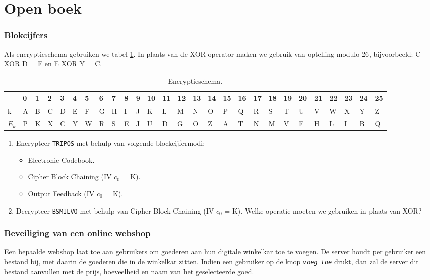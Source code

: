 \documentclass{article}
\begin{document}
\part{Open boek}
\section{Blokcijfers}
Als encryptieschema gebruiken we tabel \ref{table:encryptieschema}. In plaats van de XOR operator maken we gebruik van optelling modulo 26, bijvoorbeeld: C XOR D = F en E XOR Y = C.

\begin{table}[ht]
    \begin{tabular}{l | l l l l l l l l l l l l l l l l l l l l l l l l l l }
        & 0 & 1 & 2 & 3 & 4 & 5 & 6 & 7 & 8 & 9 & 10 & 11 & 12 & 13 & 14 & 15 & 16 & 17 & 18 & 19 & 20 & 21 & 22 & 23 & 24 & 25 \\
        \hline
        k & A & B & C & D & E & F & G & H & I & J & K & L & M & N & O & P & Q & R & S & T & U & V & W & X & Y & Z \\
        $E_k$ & P & K &X& C& Y& W& R& S& E& J& U& D& G& O& Z& A& T& N& M &V &F& H& L& I& B& Q
    \end{tabular}
    \caption{Encryptieschema.}
    \label{table:encryptieschema}
\end{table}
\begin{enumerate}

    \item
Encrypteer \texttt{TRIPOS} met behulp van volgende blockcijfermodi:
\begin{itemize}
    \item Electronic Codebook.
    \item Cipher Block Chaining (IV $c_0$ = K).
    \item Output Feedback (IV $c_0$ = K).
\end{itemize}
    \item
Decrypteer \texttt{BSMILVO} met behulp van Cipher Block Chaining (IV $c_0$ = K). Welke operatie moeten we gebruiken in plaats van XOR?
    
\end{enumerate}

\section{Beveiliging van een online webshop}
Een bepaalde webshop laat toe aan gebruikers om goederen aan hun digitale winkelkar toe te voegen. De server houdt per gebruiker een bestand bij, met daarin de goederen die in de winkelkar zitten. Indien een gebruiker op de knop \emph{\texttt{voeg toe}} drukt, dan zal de server dit bestand aanvullen met de prijs, hoeveelheid en naam van het geselecteerde goed. 
\end{document}
